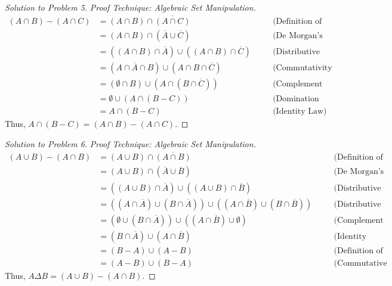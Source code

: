 \documentclass[12pt]{article}
\theoremstyle{definition}
\begin{document}
\begin{proof}[Solution to Problem 5]
\textit{Proof Technique: Algebraic Set Manipulation.}
\begin{align*}
(A \cap B) - (A \cap C) &= (A \cap B) \cap \overline{(A \cap C)} \quad &&\text{(Definition of Set Difference)} \\
&= (A \cap B) \cap (\overline{A} \cup \overline{C}) \quad &&\text{(De Morgan's Law)} \\
&= ((A \cap B) \cap \overline{A}) \cup ((A \cap B) \cap \overline{C}) \quad &&\text{(Distributive Law)} \\
&= (A \cap \overline{A} \cap B) \cup (A \cap B \cap \overline{C}) \quad &&\text{(Commutativity and Associativity)} \\
&= (\emptyset \cap B) \cup (A \cap (B \cap \overline{C})) \quad &&\text{(Complement Law and Associativity)} \\
&= \emptyset \cup (A \cap (B - C)) \quad &&\text{(Domination Law and Def. of Set Difference)} \\
&= A \cap (B - C) \quad &&\text{(Identity Law)}
\end{align*}
Thus, $A \cap (B - C) = (A \cap B) - (A \cap C)$.
\end{proof}

\begin{proof}[Solution to Problem 6]
\textit{Proof Technique: Algebraic Set Manipulation.}
\begin{align*}
(A \cup B) - (A \cap B) &= (A \cup B) \cap \overline{(A \cap B)} \quad &&\text{(Definition of Set Difference)} \\
&= (A \cup B) \cap (\overline{A} \cup \overline{B}) \quad &&\text{(De Morgan's Law)} \\
&= ((A \cup B) \cap \overline{A}) \cup ((A \cup B) \cap \overline{B}) \quad &&\text{(Distributive Law)} \\
&= ((A \cap \overline{A}) \cup (B \cap \overline{A})) \cup ((A \cap \overline{B}) \cup (B \cap \overline{B})) \quad &&\text{(Distributive Law)} \\
&= (\emptyset \cup (B \cap \overline{A})) \cup ((A \cap \overline{B}) \cup \emptyset) \quad &&\text{(Complement Law)} \\
&= (B \cap \overline{A}) \cup (A \cap \overline{B}) \quad &&\text{(Identity Law)} \\
&= (B - A) \cup (A - B) \quad &&\text{(Definition of Set Difference)} \\
&= (A - B) \cup (B - A) \quad &&\text{(Commutative Law of Union)}
\end{align*}
Thus, $A \Delta B = (A \cup B) - (A \cap B)$.
\end{proof}
\end{document}
